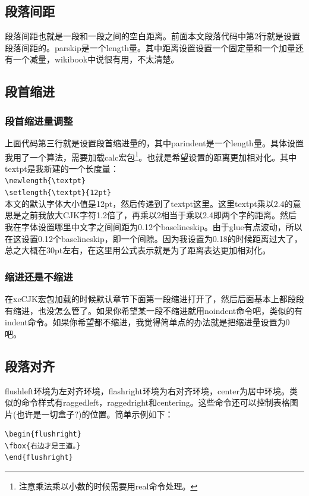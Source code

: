 \documentclass[11pt,oneside]{book}
\newlength{\textpt}
\begin{document}
\begin{common-format}
\subsection{段落间距}
段落间距也就是一段和一段之间的空白距离。前面本文段落代码中第2行就是设置段落间距的。parskip是一个length量。其中距离设置设置一个固定量和一个加量还有一个减量，wikibook中说很有用，不太清楚。

\subsection{段首缩进}
\subsubsection{段首缩进量调整}
上面代码第三行就是设置段首缩进量的，其中parindent是一个length量。具体设置我用了一个算法，需要加载calc宏包\footnote{注意乘法乘以小数的时候需要用real命令处理。}。也就是希望设置的距离更加相对化。其中textpt是我新建的一个长度量：\\
\verb+\newlength{\textpt}+\\
\verb+\setlength{\textpt}{12pt}+\\ 
本文的默认字体大小值是12pt，然后传递到了textpt这里。这里textpt乘以2.4的意思是之前我放大CJK字符1.2倍了，再乘以2相当于乘以2.4即两个字的距离。然后我在字体设置哪里中文字之间间距为0.12个baselineskip。由于glue有点波动，所以在这设置0.12个baselineskip，即一个间隙。因为我设置为0.18的时候距离过大了，总之大概在30pt左右，在这里用公式表示就是为了距离表达更加相对化。

\subsubsection{缩进还是不缩进}
在xeCJK宏包加载的时候默认章节下面第一段缩进打开了，然后后面基本上都段段有缩进，也没怎么管了。如果你希望某一段不缩进就用noindent命令吧，类似的有indent命令。如果你希望都不缩进，我觉得简单点的办法就是把缩进量设置为0吧。

\subsection{段落对齐}
flushleft环境为左对齐环境，flashright环境为右对齐环境，center为居中环境。类似的命令样式有raggedleft，raggedright和centering。这些命令还可以控制表格图片(也许是一切盒子?)的位置。简单示例如下：
\begin{Verbatim}
\begin{flushright}
\fbox{右边才是王道。}
\end{flushright}
\end{Verbatim}
\begin{flushright}
\end{flushright}



\end{common-format}
\end{document}
